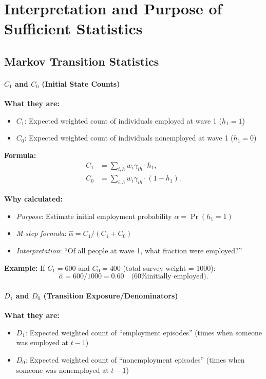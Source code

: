 \documentclass[12pt]{article}
\begin{document}
\section{Interpretation and Purpose of Sufficient Statistics}

\subsection{Markov Transition Statistics}

\paragraph{$C_1$ and $C_0$ (Initial State Counts)}

\textbf{What they are:}
\begin{itemize}
\item $C_1$: Expected weighted count of individuals employed at wave 1 ($h_1 = 1$)
\item $C_0$: Expected weighted count of individuals nonemployed at wave 1 ($h_1 = 0$)
\end{itemize}

\textbf{Formula:}
\begin{align*}
C_1 &= \sum_{i,h} w_i\gamma_{ih}\cdot h_1,\\
C_0 &= \sum_{i,h} w_i\gamma_{ih}\cdot(1-h_1).
\end{align*}

\textbf{Why calculated:}
\begin{itemize}
\item \emph{Purpose}: Estimate initial employment probability $\alpha = \Pr(h_1 = 1)$
\item \emph{M-step formula}: $\hat{\alpha} = C_1 / (C_1 + C_0)$
\item \emph{Interpretation}: ``Of all people at wave 1, what fraction were employed?''
\end{itemize}

\textbf{Example:}
If $C_1 = 600$ and $C_0 = 400$ (total survey weight = 1000):
\[
\hat{\alpha} = 600/1000 = 0.60 \quad\text{(60\% initially employed)}.
\]

\paragraph{$D_1$ and $D_0$ (Transition Exposure/Denominators)}

\textbf{What they are:}
\begin{itemize}
\item $D_1$: Expected weighted count of ``employment episodes'' (times when someone was employed at $t-1$)
\item $D_0$: Expected weighted count of ``nonemployment episodes'' (times when someone was nonemployed at $t-1$)
\end{itemize}
\end{document}
